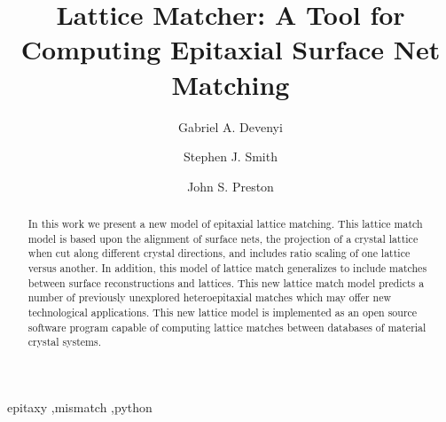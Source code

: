 \documentclass[final,5p,times,twocolumn]{elsarticle}
\begin{document}
\begin{frontmatter}



\title{Lattice Matcher: A Tool for Computing Epitaxial Surface Net Matching}


\author{Gabriel A. Devenyi}
\author{Stephen J. Smith}
\author{John S. Preston}

\address{Department of Engineering Physics, McMaster University, Hamilton, ON, Canada}

\begin{abstract}
In this work we present a new model of epitaxial lattice matching.
This lattice match model is based upon the alignment of surface nets, the projection of a crystal lattice when cut along different crystal directions, and includes ratio scaling of one lattice versus another.
In addition, this model of lattice match generalizes to include matches between surface reconstructions and lattices.
This new lattice match model predicts a number of previously unexplored heteroepitaxial matches which may offer new technological applications.
This new lattice model is implemented as an open source software program capable of computing lattice matches between databases of material crystal systems.

\end{abstract}

\begin{keyword}
epitaxy \sep mismatch \sep python



\end{keyword}

\end{frontmatter}
\end{document}

